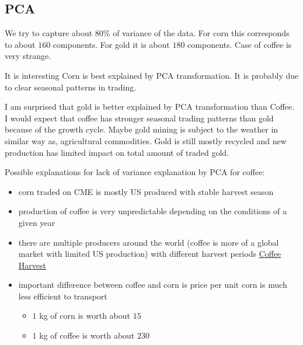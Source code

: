 \documentclass[final,2p]{elsarticle}
\begin{document}
\subsection{PCA}
We try to capture about 80\% of variance of the data. For corn this corresponds to about $160$ components. For gold it is about $180$ components.
Case of coffee is very strange.

It is interesting Corn is best explained by PCA transformation. It is probably due to clear seasonal patterns in trading.

I am surprised that gold is better explained by PCA transformation than Coffee. I would expect that coffee has stronger seasonal trading patterns than gold because of the growth cycle. Maybe gold mining is subject to the weather in similar way as, agricultural commodities. Gold is still mostly recycled and new production has limited impact on total amount of traded gold.

Possible explanations for lack of variance explanation by PCA for coffee:
\begin{itemize}
    \item corn traded on CME is mostly US produced with stable harvest season
    \item production of coffee is very unpredictable depending on the conditions of a given year
    \item there are multiple producers around the world (coffee is more of a global market with limited US production) with different harvest periods \href{https://driftaway.coffee/when-is-coffee-harvested/}{Coffee Harvest}
    \item important difference between coffee and corn is price per unit corn is much less efficient to transport
        \begin{itemize}
            \item $1$ kg of corn is worth about $15$\textcent
            \item $1$ kg of coffee is worth about $230$\textcent
        \end{itemize}
\end{itemize}
    
\end{document}
